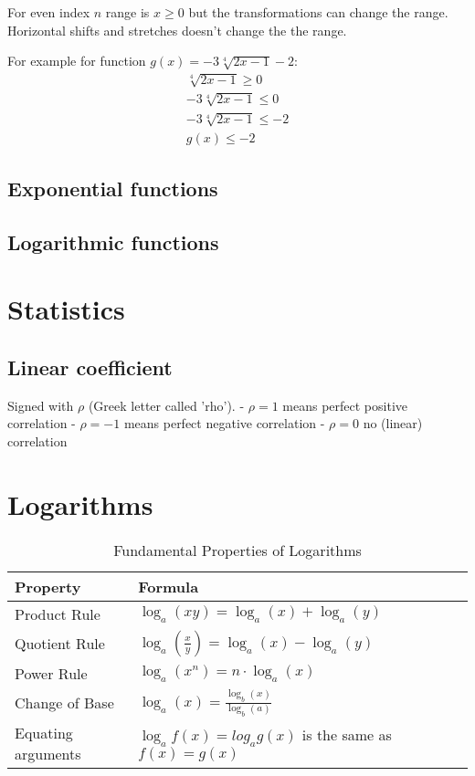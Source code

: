 \documentclass{article}
\begin{document}
For even index $n$ range is $x \geqslant 0$ but the transformations can change the range.
Horizontal shifts and stretches doesn't change the the range.

For example for function $g(x) = -3\sqrt[4]{2x-1}-2$:
\begin{equation}
  \begin{gathered}
  \sqrt[4]{2x-1} \geqslant 0 \\
  -3\sqrt[4]{2x-1} \leqslant 0 \\
  -3\sqrt[4]{2x-1} \leqslant -2 \\
  g(x) \leqslant -2
  \end{gathered}
\end{equation}

\subsection{Exponential functions}
\subsection{Logarithmic functions}
\section{Statistics}
\subsection{Linear coefficient}
Signed with $\rho$ (Greek letter called 'rho').
- $\rho = 1$ means perfect positive correlation
- $\rho = -1$ means perfect negative correlation
- $\rho = 0$ no (linear) correlation
\section{Logarithms}
\begin{table}[htbp]
\centering
\begin{tabular}{|l|l|}
\hline
\textbf{Property} & \textbf{Formula} \\
\hline
Product Rule & $\log_a(xy) = \log_a(x) + \log_a(y)$ \\
\hline
Quotient Rule & $\log_a\left(\frac{x}{y}\right) = \log_a(x) - \log_a(y)$ \\
\hline
Power Rule & $\log_a(x^n) = n \cdot \log_a(x)$ \\
\hline
Change of Base & $\log_a(x) = \frac{\log_b(x)}{\log_b(a)}$ \\
\hline
Equating arguments & $\log_af(x) = log_ag(x)$ is the same as $f(x) = g(x)$ \\
\hline
\end{tabular}
\caption{Fundamental Properties of Logarithms}
\label{tab:log_properties}
\end{table}
\end{document}
